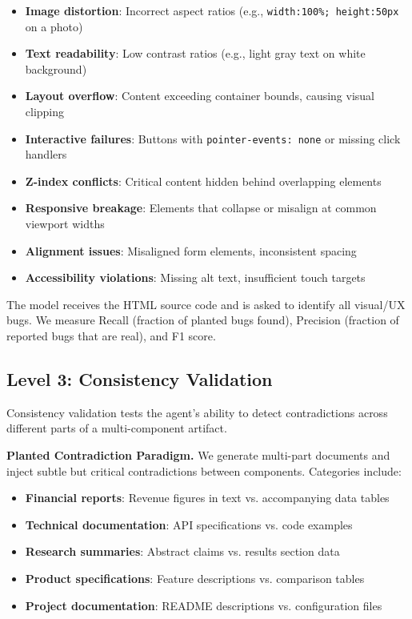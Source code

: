 \documentclass[11pt]{fairmeta}
\begin{document}
\begin{itemize}[leftmargin=*]
    \item \textbf{Image distortion}: Incorrect aspect ratios (e.g., \texttt{width:100\%; height:50px} on a photo)
    \item \textbf{Text readability}: Low contrast ratios (e.g., light gray text on white background)
    \item \textbf{Layout overflow}: Content exceeding container bounds, causing visual clipping
    \item \textbf{Interactive failures}: Buttons with \texttt{pointer-events: none} or missing click handlers
    \item \textbf{Z-index conflicts}: Critical content hidden behind overlapping elements
    \item \textbf{Responsive breakage}: Elements that collapse or misalign at common viewport widths
    \item \textbf{Alignment issues}: Misaligned form elements, inconsistent spacing
    \item \textbf{Accessibility violations}: Missing alt text, insufficient touch targets
\end{itemize}

The model receives the HTML source code and is asked to identify all visual/UX bugs. We measure Recall (fraction of planted bugs found), Precision (fraction of reported bugs that are real), and F1 score.

\subsection{Level 3: Consistency Validation}

Consistency validation tests the agent's ability to detect contradictions across different parts of a multi-component artifact.

\textbf{Planted Contradiction Paradigm.} We generate multi-part documents and inject subtle but critical contradictions between components. Categories include:

\begin{itemize}[leftmargin=*]
    \item \textbf{Financial reports}: Revenue figures in text vs. accompanying data tables
    \item \textbf{Technical documentation}: API specifications vs. code examples
    \item \textbf{Research summaries}: Abstract claims vs. results section data
    \item \textbf{Product specifications}: Feature descriptions vs. comparison tables
    \item \textbf{Project documentation}: README descriptions vs. configuration files
\end{itemize}
\end{document}
